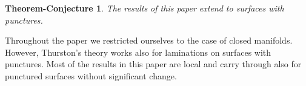 \documentclass{ip-journal}
\newtheorem{thmconj}[theorem]{Theorem-Conjecture}
\theoremstyle{definition}
\numberwithin{equation}{section}
\newcommand{\R}{\mathbb R}
\begin{document}
% 

%
 
\begin{thmconj}\label{Theorem-Conjecturepun} The results of this paper extend to surfaces with punctures. 
\end{thmconj}
Throughout the paper we restricted ourselves to the case of closed manifolds. However, Thurston's theory works also for laminations on surfaces with punctures. Most of the results in this paper are local and  carry through also for punctured surfaces without significant change.
\end{document}
